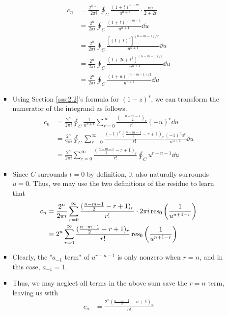 \documentclass[../finalProject.tex]{subfiles}
\begin{document}
\begin{itemize}
\begin{itemize}
\begin{itemize}
            \begin{align*}
                c_n &= \frac{2^{n+1}}{2\pi i}\oint_C\frac{(1+t)^{n-m}}{u^{n+1}}\cdot\frac{\dd{u}}{2+2t}\\
                &= \frac{2^n}{2\pi i}\oint_C\frac{(1+t)^{n-m-1}}{u^{n+1}}\dd{u}\\
                &= \frac{2^n}{2\pi i}\oint_C\frac{[(1+t)^2]^{(n-m-1)/2}}{u^{n+1}}\dd{u}\\
                &= \frac{2^n}{2\pi i}\oint_C\frac{(1+2t+t^2)^{(n-m-1)/2}}{u^{n+1}}\dd{u}\\
                &= \frac{2^n}{2\pi i}\oint_C\frac{(1+u)^{(n-m-1)/2}}{u^{n+1}}\dd{u}
            \end{align*}
            \item Using Section \ref{sss:2.2}'s formula for $(1-z)^s$, we can transform the numerator of the integrand as follows.
            \begin{align*}
                c_n &= \frac{2^n}{2\pi i}\oint_C\frac{1}{u^{n+1}}\sum_{r=0}^\infty\frac{(-\tfrac{n-m-1}{2})_r}{r!}(-u)^r\dd{u}\\
                &= \frac{2^n}{2\pi i}\oint_C\sum_{r=0}^\infty\frac{(-1)^r(\tfrac{n-m-1}{2}-r+1)_r}{r!}\frac{(-1)^ru^r}{u^{n+1}}\dd{u}\tag*{Identity 2}\\
                &= \frac{2^n}{2\pi i}\sum_{r=0}^\infty\frac{(\tfrac{n-m-1}{2}-r+1)_r}{r!}\oint_Cu^{r-n-1}\dd{u}
            \end{align*}
            \item Since $C$ surrounds $t=0$ by definition, it also naturally surrounds $u=0$. Thus, we may use the two definitions of the residue to learn that
            \begin{align*}
                c_n &= \frac{2^n}{2\pi i}\sum_{r=0}^\infty\frac{(\tfrac{n-m-1}{2}-r+1)_r}{r!}\cdot 2\pi i\operatorname{res}_0\left( \frac{1}{u^{n+1-r}} \right)\\
                &= 2^n\sum_{r=0}^\infty\frac{(\tfrac{n-m-1}{2}-r+1)_r}{r!}\operatorname{res}_0\left( \frac{1}{u^{n+1-r}} \right)
            \end{align*}
            \item Clearly, the "$a_{-1}$ term" of $u^{r-n-1}$ is only nonzero when $r=n$, and in this case, $a_{-1}=1$.
            \item Thus, we may neglect all terms in the above sum save the $r=n$ term, leaving us with
            \begin{align*}
                c_n &= \frac{2^n(\tfrac{n-m-1}{2}-n+1)_n}{n!}\\

\end{align*}
\end{itemize}
\end{itemize}
\end{itemize}
\end{document}
